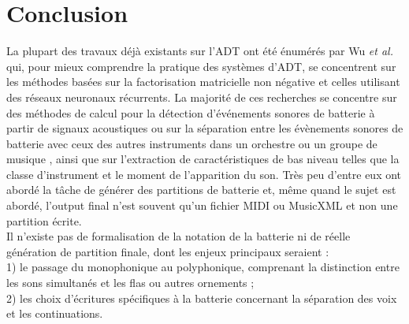 \section*{Conclusion}
La plupart des travaux déjà existants sur l’ADT ont été énumérés par Wu \textit{et al.} \cite{Review_ADT} qui, pour mieux comprendre la pratique des systèmes d’ADT, se concentrent sur les méthodes basées sur la factorisation matricielle non négative et celles utilisant des réseaux neuronaux récurrents. La majorité de ces recherches se concentre sur des méthodes de calcul pour la détection d'événements sonores de batterie à partir de signaux acoustiques ou sur la séparation entre les évènements sonores de batterie avec ceux des autres instruments dans un orchestre ou un groupe de musique \cite{2802}, ainsi que sur l'extraction de caractéristiques de bas niveau telles que la classe d'instrument et le moment de l'apparition du son. Très peu d'entre eux ont abordé la tâche de générer des partitions de batterie et, même quand le sujet est abordé, l’output final n’est souvent qu’un fichier MIDI ou MusicXML et non une partition écrite.\\
Il n’existe pas de formalisation de la notation de la batterie ni de réelle génération de partition finale, dont les enjeux principaux seraient :\\1) le passage du monophonique au polyphonique, comprenant la distinction entre les sons simultanés et les flas ou autres ornements ;\\2) les choix d’écritures spécifiques à la batterie concernant la séparation des voix et les continuations.